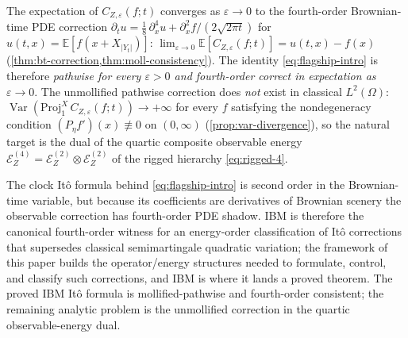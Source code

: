 \documentclass[11pt,reqno]{amsart}
\theoremstyle{plain}
\theoremstyle{definition}
\theoremstyle{remark}
\newcommand{\E}{\mathbb{E}}
\newcommand{\Energy}{\mathcal{E}}
\newcommand{\IBM}{Z}
\DeclareMathOperator{\Var}{Var}
\begin{document}
The expectation of $C_{\IBM,\varepsilon}(f;t)$ converges as
$\varepsilon\to 0$ to the fourth-order Brownian-time PDE correction
$\partial_t u=\tfrac{1}{8}\,\partial_x^{4}u+\partial_x^{2}f/
(2\sqrt{2\pi t})$ for $u(t,x)=\E[f(x+X_{|Y_t|})]$:
$\lim_{\varepsilon\to 0}\E[C_{\IBM,\varepsilon}(f;t)]=u(t,x)-f(x)$
(\cref{thm:bt-correction,thm:moll-consistency}). The identity
\eqref{eq:flagship-intro} is therefore \emph{pathwise for every
$\varepsilon>0$ and fourth-order correct in expectation as
$\varepsilon\to 0$}. The unmollified pathwise correction does
\emph{not} exist in classical $L^{2}(\Omega)$:
$\Var(\mathrm{Proj}_1^{X}\,C_{\IBM,\varepsilon}(f;t))\to+\infty$
for every $f$ satisfying the nondegeneracy condition
$(P_\eta f')(x)\not\equiv 0$ on $(0,\infty)$
(\cref{prop:var-divergence}), so the natural target is the dual of
the quartic composite observable energy
$\Energy_\IBM^{(4)}=\Energy_\IBM^{(2)}\otimes\Energy_\IBM^{(2)}$ of
the rigged hierarchy \eqref{eq:rigged-4}.

The clock It\^o formula behind \eqref{eq:flagship-intro} is second
order in the Brownian-time variable, but because its coefficients
are derivatives of Brownian scenery the observable correction has
fourth-order PDE shadow. IBM is therefore the canonical
fourth-order witness for an energy-order classification of It\^o
corrections that supersedes classical semimartingale quadratic
variation; the framework of this paper builds the operator/energy
structures needed to formulate, control, and classify such
corrections, and IBM is where it lands a proved theorem. The
proved IBM It\^o formula is mollified-pathwise and fourth-order
consistent; the remaining analytic problem is the unmollified
correction in the quartic observable-energy dual.
\end{document}
